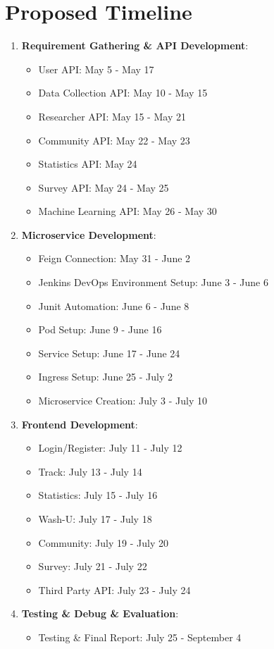\documentclass[12pt,two side]{report}
\begin{document}
\section{Proposed Timeline}
\begin{enumerate}
    \item \textbf{Requirement Gathering \& API Development}:
    \begin{itemize}
        \item User API: May 5 - May 17
        \item Data Collection API: May 10 - May 15
        \item Researcher API: May 15 - May 21
        \item Community API: May 22 - May 23
        \item Statistics API: May 24
        \item Survey API: May 24 - May 25
        \item Machine Learning API: May 26 - May 30
    \end{itemize}
    
    \item \textbf{Microservice Development}:
    \begin{itemize}
        \item Feign Connection: May 31 - June 2
        \item Jenkins DevOps Environment Setup: June 3 - June 6
        \item Junit Automation: June 6 - June 8
        \item Pod Setup: June 9 - June 16
        \item Service Setup: June 17 - June 24
        \item Ingress Setup: June 25 - July 2
        \item Microservice Creation: July 3 - July 10
    \end{itemize}
    
    \item \textbf{Frontend Development}:
    \begin{itemize}
        \item Login/Register: July 11 - July 12
        \item Track: July 13 - July 14
        \item Statistics: July 15 - July 16
        \item Wash-U: July 17 - July 18
        \item Community: July 19 - July 20
        \item Survey: July 21 - July 22
        \item Third Party API: July 23 - July 24
    \end{itemize}
    
    \item \textbf{Testing \& Debug \& Evaluation}:
    \begin{itemize}
        \item Testing \& Final Report: July 25 - September 4
    \end{itemize}
\end{enumerate}
\end{document}
